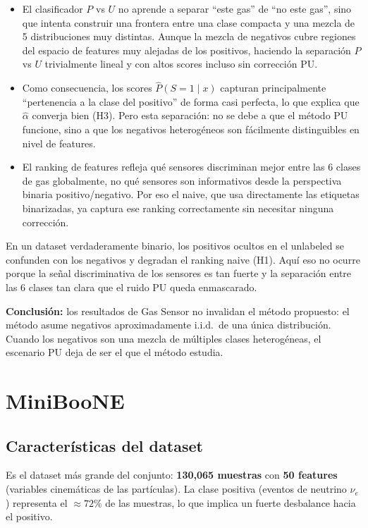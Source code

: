 \documentclass[a4paper,11pt]{article}
\begin{document}
\begin{itemize}
    \item El clasificador $P$ vs $U$ no aprende a separar ``este gas'' de ``no este gas'', sino que intenta construir una frontera entre una clase compacta y una mezcla de 5 distribuciones muy distintas. Aunque la mezcla de negativos cubre regiones del espacio de features muy alejadas de los positivos, haciendo la separación $P$ vs $U$ trivialmente lineal y con altos scores incluso sin corrección PU.
    \item Como consecuencia, los scores $\hat{P}(S=1 \mid x)$ capturan principalmente ``pertenencia a la clase del positivo'' de forma casi perfecta, lo que explica que $\hat{\alpha}$ converja bien (H3). Pero esta separación: no se debe a que el método PU funcione, sino a que los negativos heterogéneos son fácilmente distinguibles en nivel de features.
    \item El ranking de features refleja qué sensores discriminan mejor entre las 6 clases de gas globalmente, no qué sensores son informativos desde la perspectiva binaria positivo/negativo. Por eso el naive, que usa directamente las etiquetas binarizadas, ya captura ese ranking correctamente sin necesitar ninguna corrección.
\end{itemize}

En un dataset verdaderamente binario, los positivos ocultos en el unlabeled se confunden con los negativos y degradan el ranking naive (H1). Aquí eso no ocurre porque la señal discriminativa de los sensores es tan fuerte y la separación entre las 6 clases tan clara que el ruido PU queda enmascarado.

\textbf{Conclusión:} los resultados de Gas Sensor no invalidan el método propuesto: el método asume negativos aproximadamente i.i.d.\ de una única distribución. Cuando los negativos son una mezcla de múltiples clases heterogéneas, el escenario PU deja de ser el que el método estudia.

\section{MiniBooNE}

\subsection{Características del dataset}

Es el dataset más grande del conjunto: \textbf{130{,}065 muestras} con \textbf{50 features} (variables cinemáticas de las partículas). La clase positiva (eventos de neutrino $\nu_e$) representa el $\approx 72\%$ de las muestras, lo que implica un fuerte desbalance hacia el positivo.
\end{document}
